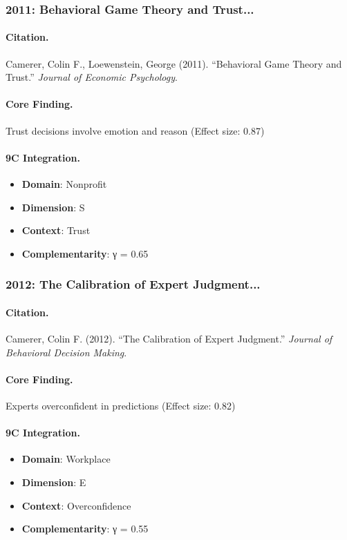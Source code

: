 \subsubsection{2011: Behavioral Game Theory and Trust...}

\paragraph{Citation.}
Camerer, Colin F., Loewenstein, George (2011). ``Behavioral Game Theory and Trust.''
\textit{Journal of Economic Psychology}.

\paragraph{Core Finding.}
Trust decisions involve emotion and reason (Effect size: 0.87)

\paragraph{9C Integration.}
\begin{itemize}[nosep]
  \item \textbf{Domain}: Nonprofit
  \item \textbf{Dimension}: S
  \item \textbf{Context}: Trust
  \item \textbf{Complementarity}: γ = 0.65
\end{itemize}

\subsubsection{2012: The Calibration of Expert Judgment...}

\paragraph{Citation.}
Camerer, Colin F. (2012). ``The Calibration of Expert Judgment.''
\textit{Journal of Behavioral Decision Making}.

\paragraph{Core Finding.}
Experts overconfident in predictions (Effect size: 0.82)

\paragraph{9C Integration.}
\begin{itemize}[nosep]
  \item \textbf{Domain}: Workplace
  \item \textbf{Dimension}: E
  \item \textbf{Context}: Overconfidence
  \item \textbf{Complementarity}: γ = 0.55
\end{itemize}

